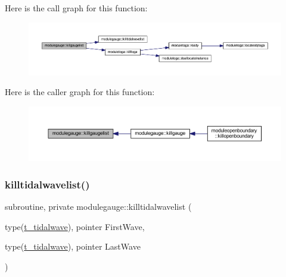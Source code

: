 Here is the call graph for this function\+:\nopagebreak
\begin{figure}[H]
\begin{center}
\leavevmode
\includegraphics[width=350pt]{namespacemodulegauge_a773a918cd865d16ad9720682f4f76009_cgraph}
\end{center}
\end{figure}
Here is the caller graph for this function\+:\nopagebreak
\begin{figure}[H]
\begin{center}
\leavevmode
\includegraphics[width=350pt]{namespacemodulegauge_a773a918cd865d16ad9720682f4f76009_icgraph}
\end{center}
\end{figure}
\mbox{\label{namespacemodulegauge_acb5358a89d47698a9abd5cea060b0cc8}} 
\subsubsection{\texorpdfstring{killtidalwavelist()}{killtidalwavelist()}}
{\footnotesize\ttfamily subroutine, private modulegauge\+::killtidalwavelist (\begin{DoxyParamCaption}\item[{type(\mbox{\hyperlink{structmodulegauge_1_1t__tidalwave}{t\+\_\+tidalwave}}), pointer}]{First\+Wave,  }\item[{type(\mbox{\hyperlink{structmodulegauge_1_1t__tidalwave}{t\+\_\+tidalwave}}), pointer}]{Last\+Wave }\end{DoxyParamCaption})\hspace{0.3cm}{\ttfamily [private]}}

